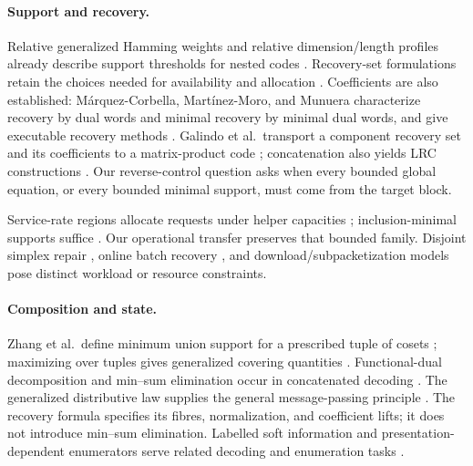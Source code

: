 \paragraph{Support and recovery.}
Relative generalized Hamming weights and relative dimension/length profiles
already describe support thresholds for nested codes
\cite{LuoEtAl2005,KuriharaUyematsuMatsumoto2012,GeilEtAl2014,SanJose2025,Geil2026}.
Recovery-set formulations retain the choices needed for availability and
allocation \cite{GopalanEtAl2012,PamiesEtAl2013,RawatMazumdarVishwanath2015,
AbdelGhaffarWeber2017,GruicaEtAl2026}.  Coefficients are also established:
M\'arquez-Corbella, Mart\'inez-Moro, and Munuera characterize recovery by dual
words and minimal recovery by minimal dual words, and give executable recovery
methods \cite[Proposition~1 and Corollary~2]{MarquezCorbellaEtAl2019}.
Galindo et al.\ transport a component recovery set and its coefficients to a
matrix-product code \cite[Proposition~8]{GalindoEtAl2023v1}; concatenation
also yields LRC constructions \cite{LiuEtAl2022,JinFu2026}.
Our reverse-control question asks when every bounded global equation, or every
bounded minimal support, must come from the target block.

Service-rate regions allocate requests under helper capacities
\cite{AktasEtAl2021,AlfaranoEtAl2024}; inclusion-minimal supports suffice
\cite[Proposition~3.3]{AlfaranoRavagnaniSoljanin2022}.
Our operational transfer preserves that bounded family.
Disjoint simplex repair \cite{CheeEtAl2024}, online batch recovery
\cite{DuzgunEtAl2026}, and download/subpacketization models
\cite{ShahEtAl2010,YeBarg2016,GuruswamiWootters2016,MatthewsEtAl2026}
pose distinct workload or resource constraints.

\paragraph{Composition and state.}
Zhang et al.\ define minimum union support for a prescribed tuple of cosets
\cite{ZhangEtAl2019}; maximizing over tuples gives generalized covering
quantities \cite{ElimelechFirerSchwartz2021}.
Functional-dual decomposition and min--sum elimination occur in concatenated
decoding \cite{Forney1966,ChenLingXing2005,GuruswamiSudan2002,BlomqvistEtAl2020}.
The generalized distributive law supplies the general message-passing principle
\cite[Theorem~3.1]{AjiMcEliece2000}.  The recovery formula specifies its fibres,
normalization, and coefficient lifts; it does not introduce min--sum elimination.
Labelled soft information and presentation-dependent enumerators serve related
decoding and enumeration tasks \cite{LoskotBeaulieu2006,Nogin2005}.

